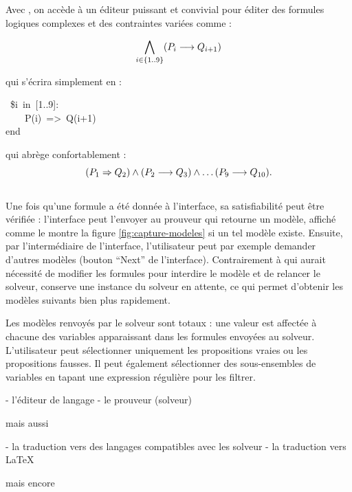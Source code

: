 Avec \touist , on accède à un éditeur puissant et convivial pour éditer des formules logiques complexes et des contraintes variées comme :

\[\bigwedge_{i \in \{1..9\}} (P_i \longrightarrow Q_{i+1})\]

\noindent
qui s'écrira simplement en \touist :
\begin{mdpre}%
~{\$i}~{in}~{}[{1}..{9}]:\\
~~~~P(i)~=\textgreater{}~Q(i+{1})\\
{end}%
\end{mdpre}%

\noindent
qui abrège confortablement :\\

\[(P_1 \Rightarrow Q_2) \wedge (P_2 \longrightarrow Q_3) \wedge \ldots (P_9\longrightarrow Q_{10}).\] 
\\


Une fois qu'une formule a été donnée à l'interface, sa satisfiabilité peut être vérifiée : l'interface peut l'envoyer au prouveur qui retourne un modèle, affiché comme le montre la figure \ref{fig:capture-modeles} si un tel modèle existe. Ensuite, par l'intermédiaire de l'interface, l'utilisateur peut par exemple demander d'autres modèles (bouton \enquote{Next} de l'interface). Contrairement à \satoulouse qui aurait nécessité de modifier les formules pour interdire le modèle et de relancer le solveur, \touist conserve une instance du solveur en attente, ce qui permet d'obtenir les modèles suivants bien plus rapidement.

Les modèles renvoyés par le solveur sont totaux : une valeur est affectée à chacune des variables apparaissant dans les formules envoyées au solveur. L'utilisateur peut sélectionner uniquement les propositions vraies ou les propositions fausses. Il peut également sélectionner des sous-ensembles de variables en tapant une expression régulière pour les filtrer.


- l'éditeur de langage \touist
- le prouveur (solveur)

mais aussi

- la traduction vers des langages compatibles avec les solveur
- la traduction vers \LaTeX

mais encore


